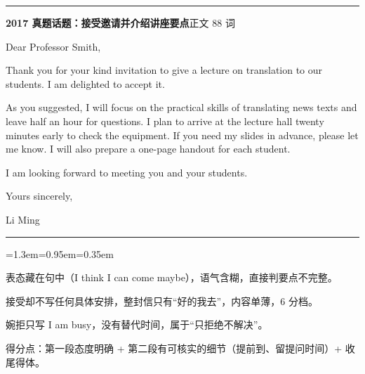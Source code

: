 \documentclass[10pt,a4paper]{ctexart}
\begin{document}
{\color{rule}\rule{\linewidth}{0.6pt}}\par\nopagebreak
\vspace{1pt}
\vspace{2pt}\noindent\colorbox{soft}{\parbox{\dimexpr\linewidth-2\fboxsep\relax}{%
\vspace{2pt}
{\footnotesize\bfseries\color{accent}2017 真题话题：接受邀请并介绍讲座要点}\hfill{\footnotesize\color{gray}正文 88 词}
\par\vspace{2pt}
\footnotesize Dear Professor Smith,\par
\footnotesize Thank you for your kind invitation to give a lecture on translation to our students. I am delighted to accept it.\par
\footnotesize As you suggested, I will focus on the practical skills of translating news texts and leave half an hour for questions. I plan to arrive at the lecture hall twenty minutes early to check the equipment. If you need my slides in advance, please let me know. I will also prepare a one-page handout for each student.\par
\footnotesize I am looking forward to meeting you and your students.\par
\footnotesize Yours sincerely,\par
\footnotesize Li Ming\par
\par{}
\par\vspace{1pt}}}\par
\vspace{2pt}
\vspace{4pt}\par\nopagebreak
{\color{rule}\rule{\linewidth}{0.6pt}}\par\nopagebreak
\vspace{1pt}
\vspace{1pt}\begingroup\setlength{\parindent}{0pt}
\begin{list}{}{\leftmargin=1.3em=0.95em=0.35em\itemindent=0pt\topsep=0pt\partopsep=0pt\parsep=1.5pt\itemsep=0pt}
\item[{\color{warn}\scriptsize$\blacksquare$}]{\footnotesize 表态藏在句中（I think I can come maybe），语气含糊，直接判要点不完整。}
\item[{\color{warn}\scriptsize$\blacksquare$}]{\footnotesize 接受却不写任何具体安排，整封信只有“好的我去”，内容单薄，6 分档。}
\item[{\color{warn}\scriptsize$\blacksquare$}]{\footnotesize 婉拒只写 I am busy，没有替代时间，属于“只拒绝不解决”。}
\item[{\color{warn}\scriptsize$\blacksquare$}]{\footnotesize 得分点：第一段态度明确 + 第二段有可核实的细节（提前到、留提问时间）+ 收尾得体。}
\end{list}
\end{document}
